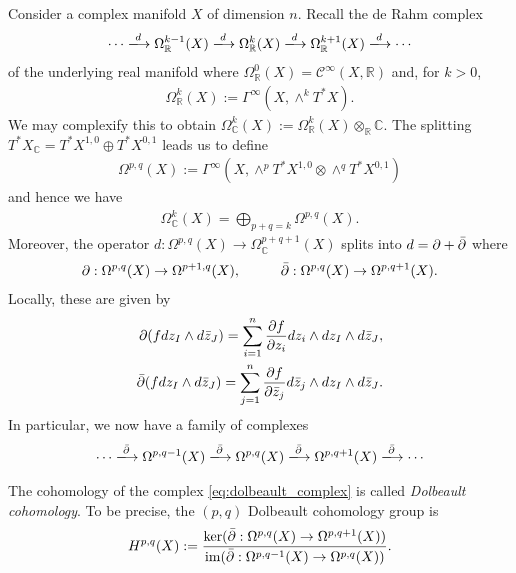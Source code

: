 \documentclass[12pt]{ociamthesis}  %
\begin{document}
Consider a complex manifold $X$ of dimension $n$. Recall the de Rahm
complex
\begin{align*}
  \cdots \xlongrightarrow{d}
  \Omega_{\mathbb{R}}^{k-1}(X)\xlongrightarrow{d}
  \Omega_{\mathbb{R}}^{k}(X)\xlongrightarrow{d}
  \Omega_{\mathbb{R}}^{k+1}(X)\xlongrightarrow{d}
  \cdots
\end{align*}
of the underlying real manifold where
$\Omega^0_{\mathbb{R}}(X) = \mathscr C^\infty(X,\mathbb{R})$ and,
for $k > 0$,
\begin{align*}
  \Omega^k_{\mathbb{R}}(X) := \Gamma^\infty(X,\wedge^k T^*X).
\end{align*}
We may complexify this to obtain
$\Omega^k_{\mathbb C}(X) := \Omega^k_{\mathbb R}(X)\otimes_{\mathbb{R}} \mathbb{C}$.
The splitting $T^*X_\mathbb{C} = T^*X^{1,0} \oplus T^*X^{0,1}$
leads us to define
\begin{align*}
  \Omega^{p,q}(X)
  := \Gamma^\infty(X,\wedge^p T^*X^{1,0} \otimes\wedge^q T^*X^{0,1})
\end{align*}
and hence we have
\begin{align*}
  \Omega^k_{\mathbb C}(X) = \bigoplus_{p+q=k} \Omega^{p,q}(X).
\end{align*}
Moreover, the operator $d : \Omega^{p,q}(X) \to \Omega^{p+q+1}_{\mathbb C}(X)$
splits into $d = \partial + {\bar{\partial}}$ where
\begin{align*}
  \partial : \Omega^{p,q}(X) \to \Omega^{p+1,q}(X),\hspace{1cm}
  {\bar{\partial}} : \Omega^{p,q}(X) \to \Omega^{p,q+1}(X).
\end{align*}
Locally, these are given by
\begin{align*}
  \partial (f dz_I \wedge d\bar z_J) = \sum_{i=1}^n \frac{\partial f}{\partial z_i} dz_i\wedge dz_I \wedge d\bar z_J, \\
  {\bar{\partial}} (f dz_I \wedge d\bar z_J) = \sum_{j=1}^n \frac{\partial f}{\partial \bar z_j} d\bar z_j\wedge dz_I \wedge d\bar z_J.
\end{align*}
In particular, we now have a family of complexes
\begin{align}\label{eq:dolbeault_complex}
  \cdots \xlongrightarrow\dol
  \Omega^{p,q-1}(X)\xlongrightarrow\dol
  \Omega^{p,q}(X)\xlongrightarrow\dol
  \Omega^{p,q+1}(X)\xlongrightarrow\dol
  \cdots
\end{align}
\begin{definition}
  The cohomology of the complex \ref{eq:dolbeault_complex} is
  called \emph{Dolbeault cohomology}. To be precise, the
  $(p,q)$ Dolbeault cohomology group is
  \begin{align*}
    H^{p,q}(X) := \frac{
      \ker({\bar{\partial}} : \Omega^{p,q}(X) \to \Omega^{p,q+1}(X))
    }{
      \operatorname{im}({\bar{\partial}} : \Omega^{p,q-1}(X) \to \Omega^{p,q}(X))
    }.
  \end{align*}
\end{definition}
\end{document}
